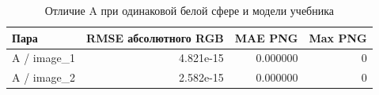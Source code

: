 \begin{table}[H]\centering\small
\caption{Отличие A при одинаковой белой сфере и модели учебника}
\begin{tabular}{@{}lrrr@{}}\toprule Пара & RMSE абсолютного RGB & MAE PNG & Max PNG\\\midrule
A / image\_1 & 4.821e-15 & 0.000000 & 0 \\
A / image\_2 & 2.582e-15 & 0.000000 & 0 \\
\bottomrule\end{tabular}\end{table}